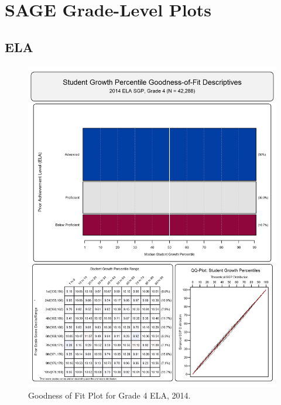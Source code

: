 \documentclass[12pt]{article}
\begin{document}
\section{SAGE Grade-Level Plots}\label{sage-grade-level-plots}

\subsection{ELA}\label{ela}

\begin{figure}[htbp]
\centering
\includegraphics{../img/Goodness_of_Fit/ELA.2014/2014_ELA_4;2013_ELA_3.png}
\caption{Goodness of Fit Plot for Grade 4 ELA, 2014.}
\end{figure}
\end{document}
